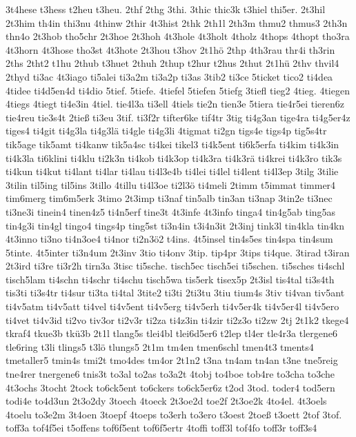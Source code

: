 {3t4hese
t3hess
t2heu
t3heu.
2thf
2thg
3thi.
3thic
thic3k
t3hiel
thi5er.
2t3hil
2t3him
th4in
thi3nu
4thinw
2thir
4t3hist
2thk
2th1l
2th3m
thmu2
thmus3
2th3n
thn4o
2t3hob
tho5chr
2t3hoe
2t3hoh
4t3hole
4t3holt
4tholz
4thops
4thopt
tho3ra
4t3horn
4t3hose
tho3st
4t3hote
2t3hou
t3hov
2t1hö
2thp
4th3rau
thr4i
th3rin
2ths
2tht2
t1hu
2thub
t3huet
2thuh
2thup
t2hur
t2hus
2thut
2t1hü
2thv
thvil4
2thyd
ti3ac
4t3iago
ti5alei
ti3a2m
ti3a2p
ti3as
3tib2
ti3ce
5ticket
tico2
ti4dea
4tidee
ti4d5en4d
ti4dio
5tief.
5tiefe.
4tiefel
5tiefen
5tiefg
3tiefl
tieg2
4tieg.
4tiegen
4tiegs
4tiegt
ti4e3in
4tiel.
tie4l3a
ti3ell
4tiels
tie2n
tien3e
5tiera
tie4r5ei
tieren6z
tie4reu
tie3s4t
2tieß
ti3eu
3tif.
ti3f2r
tifter6ke
tif4tr
3tig
ti4g3an
tige4ra
ti4g5er4z
tiges4
ti4git
ti4g3la
ti4g3lä
ti4gle
ti4g3li
4tigmat
ti2gn
tigs4e
tigs4p
tig5s4tr
tik5age
tik5amt
ti4kanw
tik5a4sc
ti4kei
tikel3
ti4k5ent
ti6k5erfa
ti4kim
ti4k3in
ti4k3la
ti6klini
ti4klu
ti2k3n
ti4kob
ti4k3op
ti4k3ra
ti4k3rä
ti4krei
ti4k3ro
tik3s
ti4kun
ti4kut
ti4lant
ti4lar
ti4lau
ti4l3e4b
ti4lei
ti4lel
ti4lent
ti4l3ep
3tilg
3tilie
3tilin
til5ing
til5ins
3tillo
4tillu
ti4l3oe
ti2l3ö
ti4meli
2timm
t5immat
timmer4
tim6merg
tim6m5erk
3timo
2t3imp
ti3naf
tin5alb
tin3an
ti3nap
3tin2e
ti3nec
ti3ne3i
tinein4
tinen4z5
ti4n5erf
tine3t
4t3infe
4t3info
tinga4
tin4g5ab
ting5as
tin4g3i
tin4gl
tingo4
tings4p
ting5st
ti3n4in
t3i4n3it
2t3inj
tink3l
tin4kla
tin4kn
4t3inno
ti3no
ti4n3oe4
ti4nor
ti2n3ö2
t4ins.
4t5insel
tin4s5es
tin4spa
tin4sum
5tinte.
4t5inter
ti3n4um
2t3inv
3tio
ti4onv
3tip.
tip4pr
3tips
ti4que.
3tirad
t3iran
2t3ird
ti3re
ti3r2h
tirn3a
3tisc
ti5sche.
tisch5ec
tisch5ei
ti5schen.
ti5sches
ti4schl
tisch5lam
ti4schn
ti4schr
ti4schu
tisch5wa
tis5erk
tisex5p
2t3isl
tis4tal
ti3s4th
tis3ti
ti3s4tr
ti4sur
ti3ta
ti4tal
3tite2
ti3ti
2ti3tu
3tiu
tium4s
3tiv
ti4van
tiv5ant
ti4v5atm
ti4v5att
ti4vel
ti4v5ent
ti4v5erg
ti4v5erh
ti4v5er4k
ti4v5er4l
ti4v5ero
ti4vet
ti4v3id
ti2vo
tiv3or
ti2v3r
ti2za
ti4z3in
ti4zir
ti2z3o
ti2zw
2tj
2t1k2
tkege4
tkraf4
tkue3b
tkü3b
2t1l
tlang5s
tlei4bl
tlei6d5er6
t2lep
tl4er
tle4r3a
tlergene6
tle6ring
t3li
tlings5
t3lö
tlungs5
2t1m
tm4en
tmen6schl
tmen4t3
tments4
tmetaller5
tmin4s
tmi2t
tmo4des
tm4or
2t1n2
t3na
tn4am
tn4an
t3ne
tne5reig
tne4rer
tnergene6
tnis3t
to3al
to2as
to3a2t
4tobj
to4boe
tob4re
to3cha
to3che
4t3ochs
3tocht
2tock
to6ck5ent
to6ckers
to6ck5er6z
t2od
3tod.
toder4
tod5ern
todi4e
to4d3un
2t3o2dy
3toech
4toeck
2t3oe2d
toe2f
2t3oe2k
4to4el.
4t3oels
4toelu
to3e2m
3t4oen
3toepf
4toeps
to3erh
to3ero
t3oest
2toeß
t3oett
2tof
3tof.
toff3a
tof4f5ei
t5offens
tof6f5ent
tof6f5ertr
4toffi
toff3l
tof4fo
toff3r
toff3s4
}
